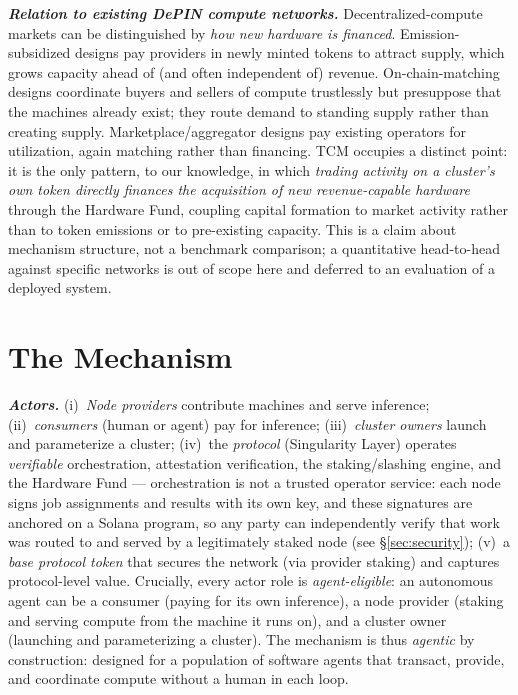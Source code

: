 \documentclass[11pt]{article}
\newcommand{\ph}[1]{\textbf{\textit{#1}}}
\begin{document}
\ph{Relation to existing DePIN compute networks.} Decentralized-compute markets can be distinguished by \textit{how new hardware is financed}. Emission-subsidized designs pay providers in newly minted tokens to attract supply, which grows capacity ahead of (and often independent of) revenue. On-chain-matching designs coordinate buyers and sellers of compute trustlessly but presuppose that the machines already exist; they route demand to standing supply rather than creating supply. Marketplace/aggregator designs pay existing operators for utilization, again matching rather than financing. TCM occupies a distinct point: it is the only pattern, to our knowledge, in which \textit{trading activity on a cluster's own token directly finances the acquisition of new revenue-capable hardware} through the Hardware Fund, coupling capital formation to market activity rather than to token emissions or to pre-existing capacity. This is a claim about mechanism structure, not a benchmark comparison; a quantitative head-to-head against specific networks is out of scope here and deferred to an evaluation of a deployed system.

\section{The Mechanism}\label{sec:mechanism}
\ph{Actors.} (i)~\textit{Node providers} contribute machines and serve inference; (ii)~\textit{consumers} (human or agent) pay for inference; (iii)~\textit{cluster owners} launch and parameterize a cluster; (iv)~the \textit{protocol} (Singularity Layer) operates \textit{verifiable} orchestration, attestation verification, the staking/slashing engine, and the Hardware Fund --- orchestration is not a trusted operator service: each node signs job assignments and results with its own key, and these signatures are anchored on a Solana program, so any party can independently verify that work was routed to and served by a legitimately staked node (see \S\ref{sec:security}); (v)~a \textit{base protocol token} that secures the network (via provider staking) and captures protocol-level value. Crucially, every actor role is \textit{agent-eligible}: an autonomous agent can be a consumer (paying for its own inference), a node provider (staking and serving compute from the machine it runs on), and a cluster owner (launching and parameterizing a cluster). The mechanism is thus \textit{agentic} by construction: designed for a population of software agents that transact, provide, and coordinate compute without a human in each loop.
\end{document}
